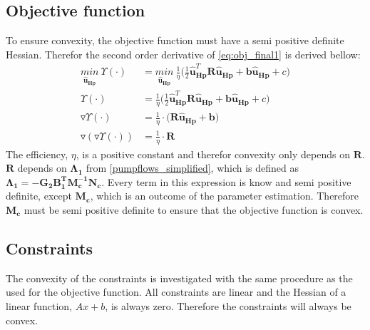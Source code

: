 \subsection{Objective function}
To ensure convexity, the objective function must have a semi positive definite Hessian. Therefor the second order derivative of \eqref{eq:obj_final1} is derived bellow: 
%
\begin{align}
\underset{\bm{\hat{u}_{Hp}}}{min} \:  \Upsilon(\cdot) &= \underset{\bm{\hat{u}_{Hp}}}{min} \:  \frac{1}{\eta}\bigg( \frac{1}{2} \bm{\hat{u}}_{\bm{Hp}}^{T} \bm{R} \bm{\hat{u}}_{\bm{Hp}} + \bm{b} \bm{\hat{u}}_{\bm{Hp}} + c \bigg)\\
%
\Upsilon(\cdot) &= \frac{1}{\eta}\bigg( \frac{1}{2} \bm{\hat{u}}_{\bm{Hp}}^{T} \bm{R} \bm{\hat{u}}_{\bm{Hp}} + \bm{b} \bm{\hat{u}}_{\bm{Hp}} + c \bigg)\\
%
\triangledown \Upsilon(\cdot) &= \frac{1}{\eta}\cdot \big(\bm{R} \bm{\hat{u}}_{\bm{Hp}} + \bm{b} \big)\\
%
\triangledown(\triangledown \Upsilon(\cdot)) &= \frac{1}{\eta}\cdot \bm{R} 
%
\end{align}
The efficiency, $\eta$, is a positive constant and therefor convexity only depends on $\bm{R}$. $\bm{R}$ depends on $\bm{\Lambda_1}$ from \eqref{pumpflows_simplified}, which is defined as $\bm{\Lambda_1} = -\bm{G_{2}} \bm{B_{1}^T}\bm{M_c^{-1}}\bm{N_c}$. Every term in this expression is know and semi positive definite, except $\bm{M_c}$, which is an outcome of the parameter estimation. Therefore $\bm{M_c}$ must be semi positive definite to ensure that the objective function is convex. 

\subsection{Constraints}

The convexity of the constraints is investigated with the same procedure as the used for the objective function. All constraints are linear and the Hessian of a linear function, $Ax+b$, is always zero. Therefore the constraints will always be convex.

